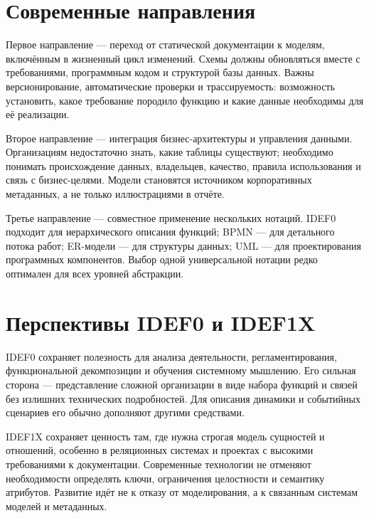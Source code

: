 \documentclass[essaypaper,paper]{pmk-graduate}
\begin{document}
\normalsize

\section{Современные направления}

Первое направление — переход от статической документации к моделям, включённым в жизненный цикл изменений. Схемы должны обновляться вместе с требованиями, программным кодом и структурой базы данных. Важны версионирование, автоматические проверки и трассируемость: возможность установить, какое требование породило функцию и какие данные необходимы для её реализации.

\par

Второе направление — интеграция бизнес-архитектуры и управления данными. Организациям недостаточно знать, какие таблицы существуют; необходимо понимать происхождение данных, владельцев, качество, правила использования и связь с бизнес-целями. Модели становятся источником корпоративных метаданных, а не только иллюстрациями в отчёте.

\par

Третье направление — совместное применение нескольких нотаций. IDEF0 подходит для иерархического описания функций; BPMN — для детального потока работ; ER-модели — для структуры данных; UML — для проектирования программных компонентов. Выбор одной универсальной нотации редко оптимален для всех уровней абстракции.

\par

\section{Перспективы IDEF0 и IDEF1X}

IDEF0 сохраняет полезность для анализа деятельности, регламентирования, функциональной декомпозиции и обучения системному мышлению. Его сильная сторона — представление сложной организации в виде набора функций и связей без излишних технических подробностей. Для описания динамики и событийных сценариев его обычно дополняют другими средствами.

\par

IDEF1X сохраняет ценность там, где нужна строгая модель сущностей и отношений, особенно в реляционных системах и проектах с высокими требованиями к документации. Современные технологии не отменяют необходимости определять ключи, ограничения целостности и семантику атрибутов. Развитие идёт не к отказу от моделирования, а к связанным системам моделей и метаданных.
\end{document}
